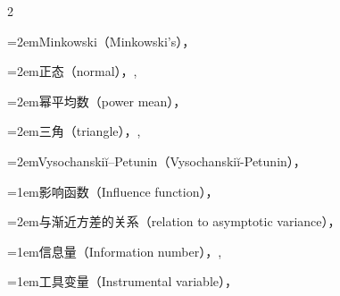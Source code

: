\begin{multicols}{2}
\par\noindent\hangindent=2em\hspace*{1em}\label{idx:575}Minkowski（Minkowski’s），\hyperref[thm:4.7.5]{\pageref*{thm:4.7.5}}\par
\par\noindent\hangindent=2em\hspace*{1em}\label{idx:576}正态（normal），\hyperref[ex:3.6.3]{\pageref*{ex:3.6.3}}, \hyperref[exercise:3.47]{\pageref*{exercise:3.47}}\par
\par\noindent\hangindent=2em\hspace*{1em}\label{idx:577}幂平均数（power mean），\hyperref[sec:4.9.2]{\pageref*{sec:4.9.2}}\par
\par\noindent\hangindent=2em\hspace*{1em}\label{idx:578}三角（triangle），\hyperref[eq:4.7.8]{\pageref*{eq:4.7.8}}, \hyperref[exercise:4.64]{\pageref*{exercise:4.64}}\par
\par\noindent\hangindent=2em\hspace*{1em}\label{idx:579}Vysochanskiĭ–Petunin（Vysochanskiĭ-Petunin），\hyperref[thm:3.8.5]{\pageref*{thm:3.8.5}}\par
\par\addvspace{2pt}
\par\noindent\hangindent=1em\hspace*{0em}\label{idx:580}影响函数（Influence function），\hyperref[sec:10.6.4]{\pageref*{sec:10.6.4}}\par
\par\noindent\hangindent=2em\hspace*{1em}\label{idx:581}与渐近方差的关系（relation to asymptotic variance），\hyperref[idxocc:581:450]{\pageref*{idxocc:581:450}}\par
\par\addvspace{2pt}
\par\noindent\hangindent=1em\hspace*{0em}\label{idx:582}信息量（Information number），\hyperref[idxocc:582:305]{\pageref*{idxocc:582:305}}, \hyperref[eq:10.1.7]{\pageref*{eq:10.1.7}}\par
\par\addvspace{2pt}
\par\noindent\hangindent=1em\hspace*{0em}\label{idx:583}工具变量（Instrumental variable），\hyperref[sec:12.6.3]{\pageref*{sec:12.6.3}}\par

\end{multicols}
